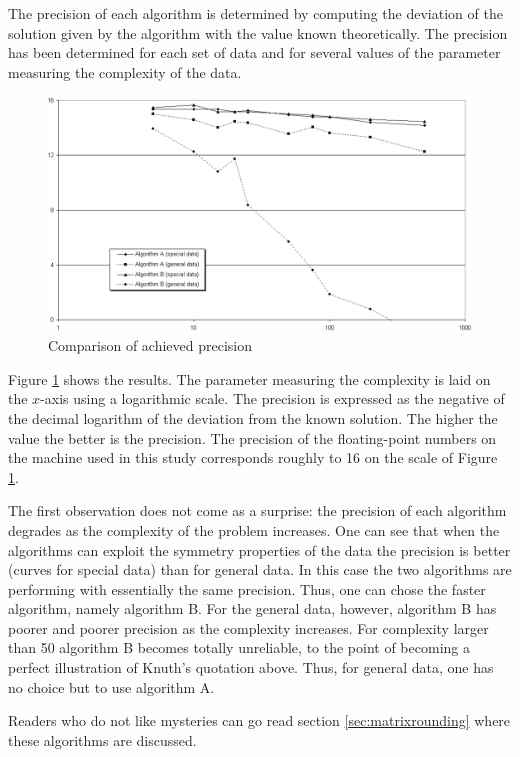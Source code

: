 \documentclass[twoside]{book}
\begin{document}
The precision of each algorithm is determined by computing the
deviation of the solution given by the algorithm with the value
known theoretically. The precision has been determined for each
set of data and for several values of the parameter measuring the
complexity of the data.

\begin{figure}
\centering\includegraphics[width=12cm]{Figures/Precision}
\caption{Comparison of achieved precision} \label{fig:precision}
\end{figure}
Figure \ref{fig:precision} shows the results. The parameter
measuring the complexity is laid on the $x$-axis using a
logarithmic scale. The precision is expressed as the negative of
the decimal logarithm of the deviation from the known solution.
The higher the value the better is the precision. The precision of
the floating-point numbers on the machine used in this study
corresponds roughly to 16 on the scale of Figure
\ref{fig:precision}.

The first observation does not come as a surprise: the precision
of each algorithm degrades as the complexity of the problem
increases. One can see that when the algorithms can exploit the
symmetry properties of the data the precision is better (curves
for special data) than for general data. In this case the two
algorithms are performing with essentially the same precision.
Thus, one can chose the faster algorithm, namely algorithm B. For
the general data, however, algorithm B has poorer and poorer
precision as the complexity increases. For complexity larger than
50 algorithm B becomes totally unreliable, to the point of
becoming a perfect illustration of Knuth's quotation above. Thus,
for general data, one has no choice but to use algorithm A.

Readers who do not like mysteries can go read section
\ref{sec:matrixrounding} where these algorithms are discussed.
\end{document}
